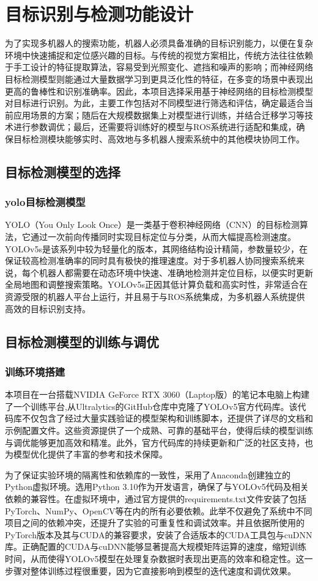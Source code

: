 \chapter{目标识别与检测功能设计}
为了实现多机器人的搜索功能，机器人必须具备准确的目标识别能力，以便在复杂环境中快速捕捉和定位感兴趣的目标。与传统的视觉方案相比，传统方法往往依赖于手工设计的特征提取算法，容易受到光照变化、遮挡和噪声的影响；而神经网络目标检测模型则能通过大量数据学习到更具泛化性的特征，在多变的场景中表现出更高的鲁棒性和识别准确率。因此，本项目选择采用基于神经网络的目标检测模型对目标进行识别。为此，主要工作包括对不同模型进行筛选和评估，确定最适合当前应用场景的方案；随后在大规模数据集上对模型进行训练，并结合迁移学习等技术进行参数调优；最后，还需要将训练好的模型与ROS系统进行适配和集成，确保目标检测模块能够实时、高效地与多机器人搜索系统中的其他模块协同工作。
\section{目标检测模型的选择}
\subsection{yolo目标检测模型}
YOLO（You Only Look Once）是一类基于卷积神经网络（CNN）的目标检测算法，它通过一次前向传播同时实现目标定位与分类，从而大幅提高检测速度。YOLOv5s是该系列中较为轻量化的版本，其网络结构设计精简，参数量较少，在保证较高检测准确率的同时具有极快的推理速度。对于多机器人协同搜索系统来说，每个机器人都需要在动态环境中快速、准确地检测并定位目标，以便实时更新全局地图和调整搜索策略。YOLOv5s正因其低计算负载和高实时性，非常适合在资源受限的机器人平台上运行，并且易于与ROS系统集成，为多机器人系统提供高效的目标识别支持。
\section{目标检测模型的训练与调优}
\subsection{训练环境搭建}
本项目在一台搭载NVIDIA GeForce RTX 3060（Laptop版）的笔记本电脑上构建了一个训练平台,从Ultralytics的GitHub仓库中克隆了YOLOv5官方代码库。该代码库不仅包含了经过大量实践验证的模型架构和训练脚本，还提供了详尽的文档和示例配置文件。这些资源提供了一个成熟、可靠的基础平台，使得后续的模型训练与调优能够更加高效和精准。此外，官方代码库的持续更新和广泛的社区支持，也为模型优化提供了丰富的参考和技术保障。

为了保证实验环境的隔离性和依赖库的一致性，采用了Anaconda创建独立的Python虚拟环境。选用Python 3.10作为开发语言，确保了与YOLOv5代码及相关依赖的兼容性。在虚拟环境中，通过官方提供的requirements.txt文件安装了包括PyTorch、NumPy、OpenCV等在内的所有必要依赖。此举不仅避免了系统中不同项目之间的依赖冲突，还提升了实验的可重复性和调试效率。并且依据所使用的PyTorch版本及其与CUDA的兼容要求，安装了合适版本的CUDA工具包与cuDNN库。正确配置的CUDA与cuDNN能够显著提高大规模矩阵运算的速度，缩短训练时间，从而使得YOLOv5模型在处理复杂数据时表现出更高的效率和稳定性。这一步骤对整体训练过程很重要，因为它直接影响到模型的迭代速度和调优效果。
